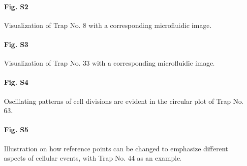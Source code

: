 \documentclass[conference]{IEEEtran}
\begin{document}
\paragraph*{Fig. S2}
\label{Fig_S2}
{Visualization of Trap No. 8
with a corresponding microfluidic image}. 


\paragraph*{Fig. S3}
\label{Fig_S3}
{ Visualization of Trap No. 33 with a corresponding microfluidic image.
}



\paragraph*{Fig. S4}
\label{Fig_S4}
{Oscillating patterns of cell divisions are evident in the circular plot of Trap No. 63}. 



\paragraph*{Fig. S5}
\label{Fig_S5}
{Illustration on how reference points can be changed to emphasize different aspects of cellular events, with Trap No. 44 as an example}. 


\end{document}
